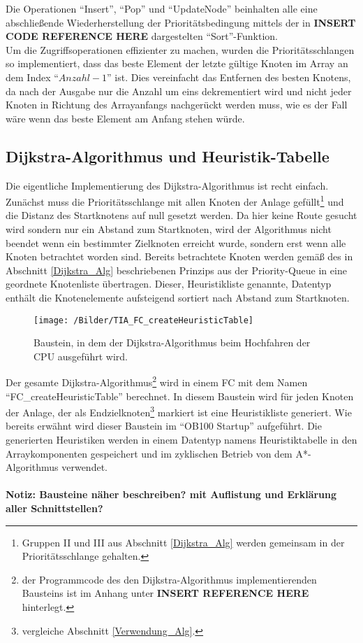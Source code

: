 			Die Operationen "`Insert"', "`Pop"' und "`UpdateNode"' beinhalten alle eine abschließende Wiederherstellung  der Prioritätsbedingung mittels der in \textbf{INSERT CODE REFERENCE HERE} dargestelten "`Sort"'-Funktion.\\
			Um die Zugriffsoperationen effizienter zu machen, wurden die Prioritätsschlangen so implementiert, dass das beste Element der letzte gültige Knoten im Array an dem Index "`$Anzahl - 1$"' ist. Dies vereinfacht das Entfernen des besten Knotens, da nach der Ausgabe nur die Anzahl um eins dekrementiert wird und nicht jeder Knoten in Richtung des Arrayanfangs nachgerückt werden muss, wie es der Fall wäre wenn das beste Element am Anfang stehen würde.
			
		\subsection{Dijkstra-Algorithmus und Heuristik-Tabelle}
			
			Die eigentliche Implementierung des Dijkstra-Algorithmus ist recht einfach. Zunächst muss die Prioritätsschlange mit allen Knoten der Anlage gefüllt\footnote{Gruppen II und III aus Abschnitt \ref{Dijkstra_Alg} werden gemeinsam in der Prioritätsschlange gehalten.} und die Distanz des Startknotens auf null gesetzt werden. 
			Da hier keine Route gesucht wird sondern nur ein Abstand zum Startknoten, wird der Algorithmus nicht beendet wenn ein bestimmter Zielknoten erreicht wurde, sondern erst wenn alle Knoten betrachtet worden sind. Bereits betrachtete Knoten werden gemäß des in Abschnitt \ref{Dijkstra_Alg} beschriebenen Prinzips aus der Priority-Queue in eine geordnete Knotenliste übertragen. Dieser, Heuristikliste genannte, Datentyp enthält die Knotenelemente aufsteigend sortiert nach Abstand zum Startknoten.
			
			\begin{figure}[h]
				\centering
				\texttt{[image: /Bilder/TIA\_FC\_createHeuristicTable]}
				\vspace{0.2cm}
				\caption{Baustein, in dem der Dijkstra-Algorithmus beim Hochfahren der CPU ausgeführt wird.}
				
			\end{figure}
			Der gesamte Dijkstra-Algorithmus\footnote{der Programmcode des den Dijkstra-Algorithmus implementierenden Bausteins ist im Anhang unter \textbf{INSERT REFERENCE HERE} hinterlegt.} wird in einem \ac{FC} mit dem Namen "`FC\_createHeuristicTable"' berechnet. In diesem Baustein wird für jeden Knoten der Anlage, der als Endzielknoten\footnote{vergleiche Abschnitt \ref{Verwendung_Alg}.} markiert ist eine Heuristikliste generiert. Wie bereits erwähnt wird dieser Baustein im "`\ac{OB}100 Startup"' aufgeführt. Die generierten Heuristiken werden in einem Datentyp namens Heuristiktabelle in den Arraykomponenten gespeichert und im zyklischen Betrieb von dem A*-Algorithmus verwendet. 
			\\
			\\
			\textbf{Notiz: Bausteine näher beschreiben? mit Auflistung und Erklärung aller Schnittstellen?}
			

